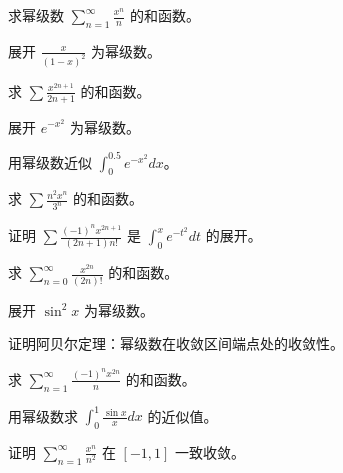 \begin{exercise}[4] 求幂级数 \(\sum_{n=1}^\infty \frac{x^n}{n}\) 的和函数。\end{exercise}
\begin{exercise}[4] 展开 \(\frac{x}{(1-x)^2}\) 为幂级数。\end{exercise}
\begin{exercise}[4] 求 \(\sum \frac{x^{2n+1}}{2n+1}\) 的和函数。\end{exercise}
\begin{exercise}[4] 展开 \(e^{-x^2}\) 为幂级数。\end{exercise}
\begin{exercise}[4] 用幂级数近似 \(\int_0^{0.5} e^{-x^2}dx\)。\end{exercise}
\begin{exercise}[5] 求 \(\sum \frac{n^2 x^n}{3^n}\) 的和函数。\end{exercise}
\begin{exercise}[5] 证明 \(\sum \frac{(-1)^n x^{2n+1}}{(2n+1)n!}\) 是 \(\int_0^x e^{-t^2}dt\) 的展开。\end{exercise}
\begin{exercise}[5] 求 \(\sum_{n=0}^\infty \frac{x^{2n}}{(2n)!}\) 的和函数。\end{exercise}
\begin{exercise}[5] 展开 \(\sin^2 x\) 为幂级数。\end{exercise}
\begin{exercise}[6] 证明阿贝尔定理：幂级数在收敛区间端点处的收敛性。\end{exercise}
\begin{exercise}[6] 求 \(\sum_{n=1}^\infty \frac{(-1)^n x^{2n}}{n}\) 的和函数。\end{exercise}
\begin{exercise}[6] 用幂级数求 \(\int_0^1 \frac{\sin x}{x}dx\) 的近似值。\end{exercise}
\begin{exercise}[7] 证明 \(\sum_{n=1}^\infty \frac{x^n}{n^2}\) 在 \([-1,1]\) 一致收敛。\end{exercise}
